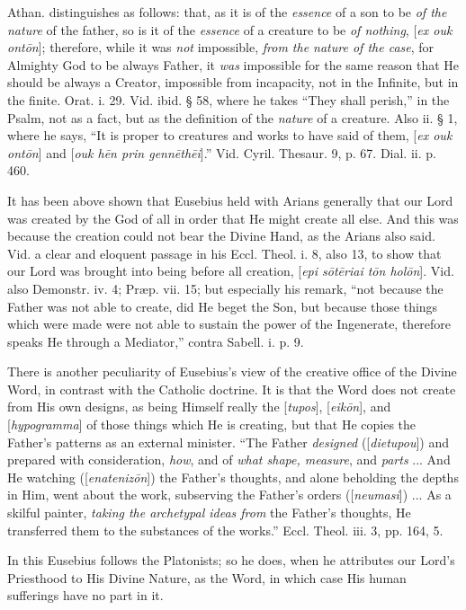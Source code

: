 Athan. distinguishes as follows: that, as it is
of the \emph{essence} of
a son to be \emph{of the nature}
of the father, so is it of the \emph{essence}
of a creature to be \emph{of nothing}, [\emph{ex ouk ont\={o}n}];
therefore, while it was \emph{not}
impossible, \emph{from the nature of the case},
for Almighty God to be always Father, it \emph{was}
impossible for the same reason that He should be always a
Creator, impossible from incapacity, not in the Infinite, but in the
finite. Orat. i. 29. Vid. ibid. § 58, where he takes ``They
shall perish,'' in the Psalm, not as a fact, but as the definition of
the \emph{nature} of a
creature. Also ii. § 1, where he says, ``It
is proper to creatures and works to have said of them, [\emph{ex ouk ont\={o}n}]
and [\emph{ouk h\={e}n prin genn\={e}th\={e}i}].'' Vid. Cyril.
Thesaur. 9, p. 67. Dial. ii. p. 460.

It has been above shown that Eusebius held with
Arians generally that our Lord was created by the God of all in order
that He might create all else. And this was because the creation could
not bear the Divine Hand, as the Arians also said. Vid. a clear and
eloquent passage in his Eccl. Theol. i. 8, also 13, to show that our
Lord was brought into being before all creation, [\emph{epi s\={o}t\={e}riai
t\={o}n hol\={o}n}]. Vid. also Demonstr. iv. 4; Præp. vii.
15; but especially his remark, ``not because the Father was not able to
create, did He beget the Son, but because those things which were made
were not able to sustain the power of the Ingenerate, therefore speaks He through a Mediator,'' contra Sabell. i. p. 9.

There is another peculiarity of Eusebius's view
of the creative office of the Divine Word, in contrast with the
Catholic doctrine. It is that the Word does not create from His own
designs, as being Himself really the [\emph{tupos}], [\emph{eik\={o}n}],
and [\emph{hypogramma}] of those things which He is creating, but that
He copies the Father's patterns as an external minister. ``The
Father \emph{designed} ([\emph{dietupou}])
and prepared with consideration, \emph{how},
and of \emph{what shape, measure},
and \emph{parts} ...
And He watching ([\emph{enateniz\={o}n}]) the Father's thoughts,
and alone beholding the depths in Him, went about the work, subserving
the Father's orders ([\emph{neumasi}]) ... As a skilful painter, \emph{taking
the archetypal ideas from}
the Father's thoughts, He transferred them to the substances of
the works.'' Eccl. Theol. iii. 3, pp. 164, 5.

In this Eusebius follows the Platonists; so he
does, when he attributes our Lord's Priesthood to His Divine Nature,
as the Word, in which case His human sufferings have no part in it.

